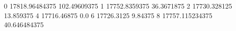 0 17818.96484375 102.49609375
1 17752.8359375 36.3671875
2 17730.328125 13.859375
4 17716.46875 0.0
6 17726.3125 9.84375
8 17757.115234375 40.646484375
